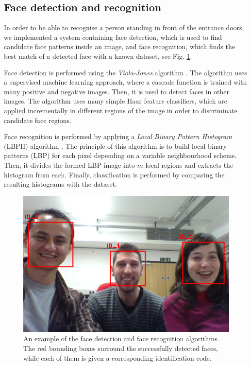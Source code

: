 \documentclass[conference]{IEEEtran}
\begin{document}
\subsection{\label{sec:vision}Face detection and recognition}

In order to be able to recognise a person standing in front of the entrance doors, we implemented a system containing face detection, which is used to find candidate face patterns inside an image, and face recognition, which finds the best match of a detected face with a known dataset, see Fig. \ref{fig:face}.

Face detection is performed using the \textit{Viola-Jones} algorithm \cite{Viola01_RapidObjDet}. The algorithm uses a supervised machine learning approach, where a cascade function is trained with many positive and negative images. Then, it is used to detect faces in other images. The algorithm uses many simple Haar feature classifiers, which are applied incrementally in different regions of the image in order to discriminate candidate face regions. 

Face recognition is performed by applying a \textit{Local Binary Pattern Histogram} (LBPH) algorithm \cite{Ahonen04_FaceRecLBP}. The principle of this algorithm is to build local binary patterns (LBP) for each pixel depending on a variable neighbourhood scheme. Then, it divides the formed LBP image into $m$ local regions and extracts the histogram from each. Finally, classification is performed by comparing the resulting histograms with the dataset.

\begin{figure}[!t]
\centering
\includegraphics[width=3.in]{BARC_FaceRec.png}
\caption{An example of the face detection and face recognition algorithms. The red bounding boxes surround the successfully detected faces, while each of them is given a corresponding identification code.}
\label{fig:face}
\end{figure}
\end{document}
